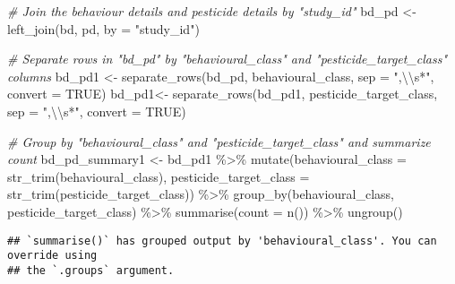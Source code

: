 \documentclass[
]{article}
\newenvironment{Shaded}{\begin{snugshade}}{\end{snugshade}}
\newcommand{\AttributeTok}[1]{\textcolor[rgb]{0.77,0.63,0.00}{#1}}
\newcommand{\CommentTok}[1]{\textcolor[rgb]{0.56,0.35,0.01}{\textit{#1}}}
\newcommand{\ConstantTok}[1]{\textcolor[rgb]{0.00,0.00,0.00}{#1}}
\newcommand{\FunctionTok}[1]{\textcolor[rgb]{0.00,0.00,0.00}{#1}}
\newcommand{\NormalTok}[1]{#1}
\newcommand{\OtherTok}[1]{\textcolor[rgb]{0.56,0.35,0.01}{#1}}
\newcommand{\SpecialCharTok}[1]{\textcolor[rgb]{0.00,0.00,0.00}{#1}}
\newcommand{\StringTok}[1]{\textcolor[rgb]{0.31,0.60,0.02}{#1}}
\begin{document}
\begin{Shaded}
\begin{Highlighting}[]
\CommentTok{\# Join the behaviour details and pesticide details by "study\_id"}
\NormalTok{bd\_pd }\OtherTok{\textless{}{-}} \FunctionTok{left\_join}\NormalTok{(bd, pd, }\AttributeTok{by =} \StringTok{"study\_id"}\NormalTok{)}

\CommentTok{\# Separate rows in "bd\_pd" by "behavioural\_class" and "pesticide\_target\_class" columns}
\NormalTok{bd\_pd1 }\OtherTok{\textless{}{-}} \FunctionTok{separate\_rows}\NormalTok{(bd\_pd, behavioural\_class, }\AttributeTok{sep =} \StringTok{",}\SpecialCharTok{\textbackslash{}\textbackslash{}}\StringTok{s*"}\NormalTok{, }\AttributeTok{convert =} \ConstantTok{TRUE}\NormalTok{)}
\NormalTok{bd\_pd1}\OtherTok{\textless{}{-}} \FunctionTok{separate\_rows}\NormalTok{(bd\_pd1, pesticide\_target\_class, }\AttributeTok{sep =} \StringTok{",}\SpecialCharTok{\textbackslash{}\textbackslash{}}\StringTok{s*"}\NormalTok{, }\AttributeTok{convert =} \ConstantTok{TRUE}\NormalTok{)}

\CommentTok{\# Group by "behavioural\_class" and "pesticide\_target\_class" and summarize count}
\NormalTok{bd\_pd\_summary1 }\OtherTok{\textless{}{-}}\NormalTok{ bd\_pd1 }\SpecialCharTok{\%\textgreater{}\%}
  \FunctionTok{mutate}\NormalTok{(}\AttributeTok{behavioural\_class =} \FunctionTok{str\_trim}\NormalTok{(behavioural\_class),}
         \AttributeTok{pesticide\_target\_class =} \FunctionTok{str\_trim}\NormalTok{(pesticide\_target\_class)) }\SpecialCharTok{\%\textgreater{}\%}
  \FunctionTok{group\_by}\NormalTok{(behavioural\_class, pesticide\_target\_class) }\SpecialCharTok{\%\textgreater{}\%}
  \FunctionTok{summarise}\NormalTok{(}\AttributeTok{count =} \FunctionTok{n}\NormalTok{()) }\SpecialCharTok{\%\textgreater{}\%}
  \FunctionTok{ungroup}\NormalTok{() }
\end{Highlighting}
\end{Shaded}

\begin{verbatim}
## `summarise()` has grouped output by 'behavioural_class'. You can override using
## the `.groups` argument.
\end{verbatim}
\end{document}
